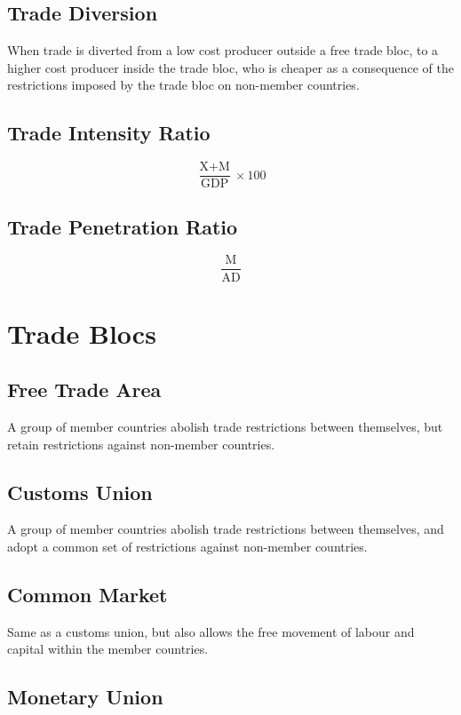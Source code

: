 \documentclass[a4paper,11pt]{report}
\begin{document}
\subsection{Trade Diversion}

When trade is diverted from a low cost producer outside a free trade bloc, to
a higher cost producer inside the trade bloc, who is cheaper as a consequence
of the restrictions imposed by the trade bloc on non-member countries.

\subsection{Trade Intensity Ratio}

$$
\frac{\text{X} + \text{M}}{\text{GDP}} \times 100
$$

\subsection{Trade Penetration Ratio}

$$
\frac{\text{M}}{\text{AD}}
$$


\section{Trade Blocs}

\subsection{Free Trade Area}

A group of member countries abolish trade restrictions between themselves, but
retain restrictions against non-member countries.

\subsection{Customs Union}

A group of member countries abolish trade restrictions between themselves, and
adopt a common set of restrictions against non-member countries.

\subsection{Common Market}

Same as a customs union, but also allows the free movement of labour and
capital within the member countries.

\subsection{Monetary Union}
\end{document}
